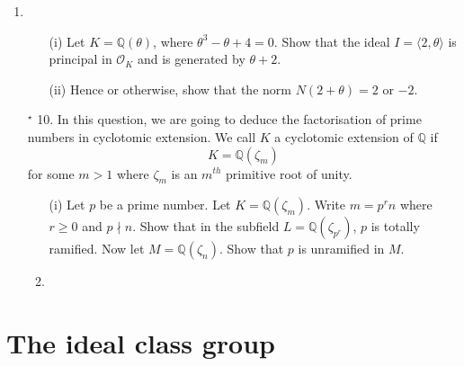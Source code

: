 \begin{enumerate}
\item
\begin{enumerate}
\item[(i)] Let $K=\mathbb{Q}(\theta)$, where $\theta^3-\theta+4=0$. Show that the ideal $I=\langle 2,\theta \rangle$ is principal in $\mathcal{O}_K$ and is generated by $\theta+2$.
\item[(ii)] Hence or otherwise, show that the norm $N(2+\theta)=2$ or $-2$.
\end{enumerate}
\item[$^\star$ 10.] In this question, we are going to deduce the factorisation of prime numbers in cyclotomic extension. We call $K$ a cyclotomic extension of $\mathbb{Q}$ if
$$K=\mathbb{Q}(\zeta_m)$$
for some $m>1$ where $\zeta_m$ is an $m^{th}$ primitive root of unity.
\begin{enumerate}
\item[(i)] Let $p$ be a prime number. Let $K=\mathbb{Q}(\zeta_m)$. Write $m=p^r n$ where $r \ge 0$ and
$p \nmid n$. Show that in the subfield $L=\mathbb{Q}(\zeta_{p^r})$, $p$ is totally ramified. Now let
$M=\mathbb{Q}(\zeta_n)$. Show that $p$ is unramified in $M$.
\item
\end{enumerate}
\end{enumerate}

\section{The ideal class group}
